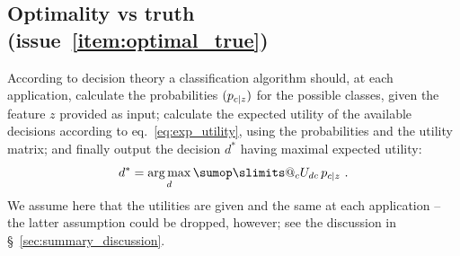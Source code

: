 \documentclass[\ifafour a4paper,12pt,\else a5paper,10pt,\fi%
onecolumn,oneside,article,%
british%
]{memoir}
\makeatletter
\theoremstyle{remark}
\theoremstyle{innote}
\def\sum{\DOTSI\sumop\slimits@}
\renewcommand*{\|}[1][]{\nonscript\:#1\vert\nonscript\:\mathopen{}}
\newcommand*{\sect}{\S}%
\newcommand*{\eqn}{eq.}%
\newcommand*{\puzzle}{{\fontencoding{U}\fontfamily{fontawesometwo}\selectfont\symbol{225}}}
\newcommand{\mynoteu}[1]{{\footnotesize\color{notecolour}\puzzle\ #1}}
\DeclareMathOperator*{\argmax}{arg\,max}
\newcommand*{\Po}{\mathord{+}}
\newcommand*{\Ne}{\mathord{-}}
\newcommand*{\tp}{\textrm{tp}}
\newcommand*{\fp}{\textrm{fp}}
\newcommand*{\itemyes}{{\fontencoding{U}\fontfamily{pzd}\selectfont\symbol{51}}}
\newcommand*{\itemno}{{\fontencoding{U}\fontfamily{pzd}\selectfont\symbol{55}}}
\makeatother
\begin{document}
  








\subsection{Optimality vs truth (issue~\ref{item:optimal_true})}
\label{sec:optimality_truth}

According to decision theory a classification algorithm should, at each application, calculate the probabilities $(p_{c\|z})$ for the possible classes, given the feature $z$ provided as input; calculate the expected utility of the available decisions according to \eqn~\eqref{eq:exp_utility}, using the probabilities and the utility matrix; and finally output the decision $d^{*}$ having maximal expected utility:
\begin{equation}
  \label{eq:argmax_decision}
  d^{*} = \argmax_{d}   \sum_{c} U_{dc}\, p_{c\|z} \ .
\end{equation}
We assume here that the utilities are given and the same at each application -- the latter assumption could be dropped, however; see the discussion in \sect~\ref{sec:summary_discussion}.
\end{document}
